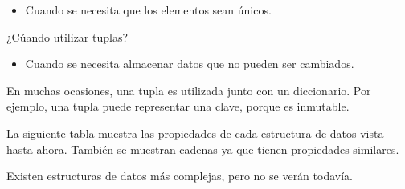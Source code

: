 \begin{itemize}
  \item Cuando se necesita que los elementos sean únicos.
\end{itemize}

¿Cúando utilizar tuplas?

\begin{itemize}
  \item Cuando se necesita almacenar datos que no pueden ser cambiados.
\end{itemize}

En muchas ocasiones, una tupla es utilizada junto con un diccionario.
Por ejemplo, una tupla puede representar una clave, porque es inmutable.
\medskip

La siguiente tabla muestra las propiedades de cada estructura de datos vista hasta ahora.
También se muestran cadenas ya que tienen propiedades similares.
\medskip\medskip


\medskip\medskip

Existen estructuras de datos más complejas, pero no se verán todavía.

\clearpage